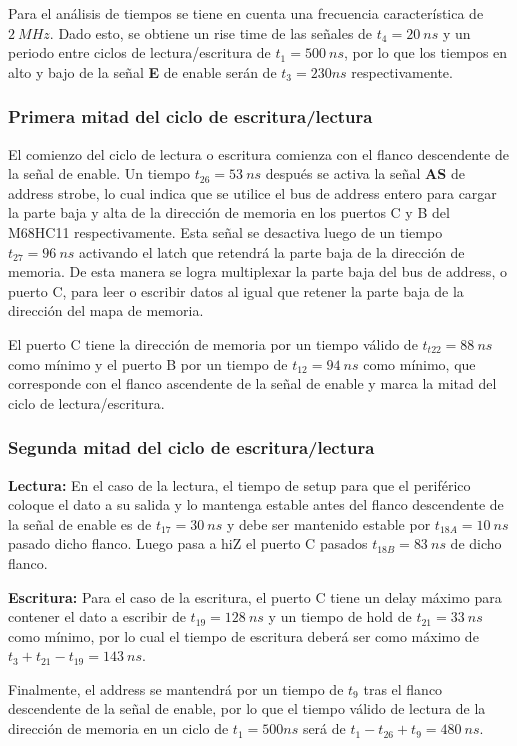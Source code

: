 Para el análisis de tiempos se tiene en cuenta una frecuencia característica de $2 \ MHz$. Dado esto, se obtiene un rise time de las señales de $t_4 = 20 \ ns$ y un periodo entre ciclos de lectura/escritura de $t_1 = 500 \ ns$, por lo que los tiempos en alto y bajo de la señal \textbf{E} de enable serán de $t_3 = 230 ns$ respectivamente. 

\subsubsection{Primera mitad del ciclo de escritura/lectura}

El comienzo del ciclo de lectura o escritura comienza con el flanco descendente de la señal de enable. Un tiempo $t_{26} = 53 \ ns$ después se activa la señal \textbf{AS} de address strobe, lo cual indica que se utilice el bus de address entero para cargar la parte baja y alta de la dirección de memoria en los puertos C y B del M68HC11 respectivamente. Esta señal se desactiva luego de un tiempo $t_{27} = 96 \ ns$ activando el latch que retendrá la parte baja de la dirección de memoria. De esta manera se logra multiplexar la parte baja del bus de address, o puerto C, para leer o escribir datos al igual que retener la parte baja de la dirección del mapa de memoria.

El puerto C tiene la dirección de memoria por un tiempo válido de $t_{t22} = 88 \ ns$ como mínimo y el puerto B por un tiempo de $t_{12} = 94 \ ns$ como mínimo, que corresponde con el flanco ascendente de la señal de enable y marca la mitad del ciclo de lectura/escritura.

\subsubsection{Segunda mitad del ciclo de escritura/lectura} 
\textbf{Lectura:}
En el caso de la lectura, el tiempo de setup para que el periférico coloque el dato a su salida y lo mantenga estable antes del flanco descendente de la señal de enable es de $t_{17} = 30 \ ns$ y debe ser mantenido estable por $t_{18A} = 10 \ ns$ pasado dicho flanco. Luego pasa a hiZ el puerto C pasados $t_{18B} = 83 \ ns$ de dicho flanco.

\textbf{Escritura:}
Para el caso de la escritura, el puerto C tiene un delay máximo para contener el dato a escribir de $t_{19} = 128 \ ns$ y un tiempo de hold de $t_{21} = 33 \ ns$ como mínimo, por lo cual el tiempo de escritura deberá ser como máximo de $t_{3} + t_{21} - t_{19} = 143 \ ns$.

Finalmente, el address se mantendrá por un tiempo de $t_9$ tras el flanco descendente de la señal de enable, por lo que el tiempo válido de lectura de la dirección de memoria en un ciclo de $t_1 = 500ns$ será de $t_1 - t_{26} + t_{9} = 480 \ ns$.